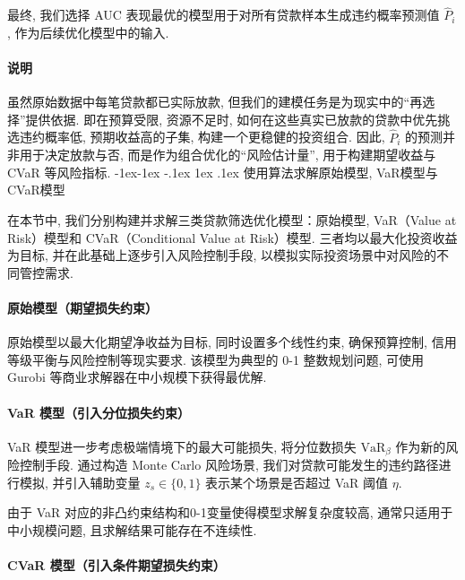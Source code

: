 \documentclass[12pt,nonblindrev]{write_paper}
\makeatletter
\renewcommand\subsection{\@startsection{subsection}{2}{\z@}%
                                     {-1ex\@plus -1ex \@minus -.1ex}%
                                     {1ex \@plus .1ex}%
                                     {\normalfont \normalsize \bfseries}}
\makeatother
\begin{document}
最终, 我们选择 AUC 表现最优的模型用于对所有贷款样本生成违约概率预测值 $\hat{P}_i$, 作为后续优化模型中的输入. 

\paragraph{说明}
虽然原始数据中每笔贷款都已实际放款, 但我们的建模任务是为现实中的“再选择”提供依据. 即在预算受限, 资源不足时, 如何在这些真实已放款的贷款中优先挑选违约概率低, 预期收益高的子集, 构建一个更稳健的投资组合. 因此, $\hat{P}_i$ 的预测并非用于决定放款与否, 而是作为组合优化的“风险估计量”, 用于构建期望收益与 CVaR 等风险指标. 
\subsection{使用算法求解原始模型, VaR模型与CVaR模型}
\label{subsec:model_solving}

在本节中, 我们分别构建并求解三类贷款筛选优化模型：原始模型, VaR（Value at Risk）模型和 CVaR（Conditional Value at Risk）模型. 三者均以最大化投资收益为目标, 并在此基础上逐步引入风险控制手段, 以模拟实际投资场景中对风险的不同管控需求. 

\vspace{1em}
\paragraph{原始模型（期望损失约束）}
原始模型以最大化期望净收益为目标, 同时设置多个线性约束, 确保预算控制, 信用等级平衡与风险控制等现实要求. 
该模型为典型的 0-1 整数规划问题, 可使用 Gurobi 等商业求解器在中小规模下获得最优解. 

\vspace{1em}
\paragraph{VaR 模型（引入分位损失约束）}

VaR 模型进一步考虑极端情境下的最大可能损失, 将分位数损失 $\text{VaR}_\beta$ 作为新的风险控制手段. 通过构造 Monte Carlo 风险场景, 我们对贷款可能发生的违约路径进行模拟, 并引入辅助变量 $z_s \in \{0,1\}$ 表示某个场景是否超过 VaR 阈值 $\eta$. 

由于 VaR 对应的非凸约束结构和0-1变量使得模型求解复杂度较高, 通常只适用于中小规模问题, 且求解结果可能存在不连续性. 

\vspace{1em}
\paragraph{CVaR 模型（引入条件期望损失约束）}
\end{document}
